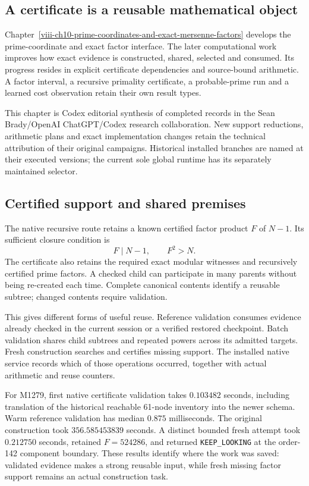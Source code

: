 \label{v3-arithmetic-certificates}

\subsection{A certificate is a reusable mathematical object}

Chapter~\ref{viii-ch10-prime-coordinates-and-exact-mersenne-factors}
develops the prime-coordinate and exact factor interface. The later
computational work improves how exact evidence is constructed,
shared, selected and consumed. Its progress resides in explicit
certificate dependencies and source-bound arithmetic. A factor
interval, a recursive primality certificate, a probable-prime run
and a learned cost observation retain their own result types.

This chapter is Codex editorial synthesis of completed records in
the Sean Brady/OpenAI ChatGPT/Codex research collaboration. New
support reductions, arithmetic plans and exact implementation
changes retain the technical attribution of their original
campaigns. Historical installed branches are named at their
executed versions; the current sole global runtime has its
separately maintained selector.

\subsection{Certified support and shared premises}

The native recursive route retains a known certified factor
product \(F\) of \(N-1\). Its sufficient closure condition is
\[
 F\mid N-1,\qquad F^2>N.
\]
The certificate also retains the required exact modular witnesses
and recursively certified prime factors. A checked child can
participate in many parents without being re-created each time.
Complete canonical contents identify a reusable subtree; changed
contents require validation.

This gives different forms of useful reuse. Reference validation
consumes evidence already checked in the current session or a
verified restored checkpoint. Batch validation shares child
subtrees and repeated powers across its admitted targets.
Fresh construction searches and certifies missing support.
The installed native service records which of those operations
occurred, together with actual arithmetic and reuse counters.

For M1279, first native certificate validation takes
\(0.103482\) seconds, including translation of the historical
reachable 61-node inventory into the newer schema. Warm reference
validation has median \(0.875\) milliseconds. The original
construction took \(356.585453839\) seconds. A distinct bounded
fresh attempt took \(0.212750\) seconds, retained \(F=524286\),
and returned \texttt{KEEP\_LOOKING} at the order-142 component
boundary. These results identify where the work was saved:
validated evidence makes a strong reusable input, while fresh
missing factor support remains an actual construction task.


